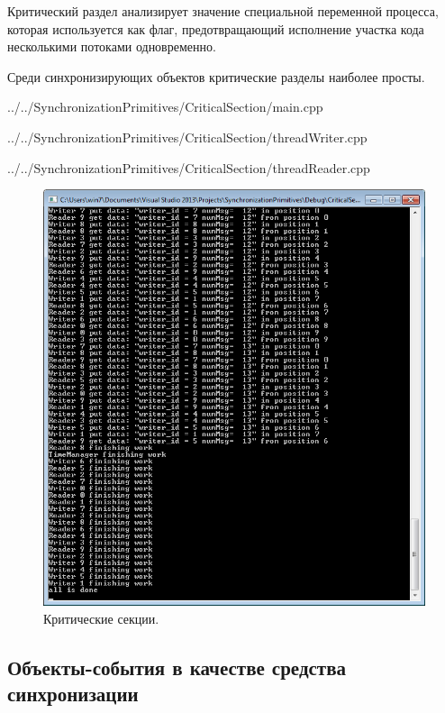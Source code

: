 \documentclass[a4paper, 12pt]{article}		%
\begin{document}
Критический раздел анализирует значение специальной переменной процесса, которая используется как флаг, предотвращающий исполнение участка кода несколькими потоками одновременно.

Среди синхронизирующих объектов критические разделы наиболее просты.


{../../SynchronizationPrimitives/CriticalSection/main.cpp}


{../../SynchronizationPrimitives/CriticalSection/threadWriter.cpp}


{../../SynchronizationPrimitives/CriticalSection/threadReader.cpp}

\begin{figure}[h!]
\centering
\includegraphics[scale=1]{res/003}
\caption{Критические секции.}
\end{figure}

\newpage
\subsection{Объекты-события в качестве средства синхронизации}
\end{document}
